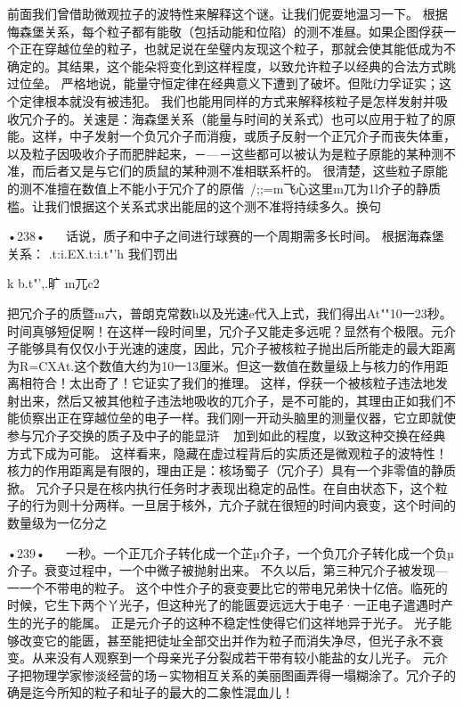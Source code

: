 前面我们曾借助微观拉子的波特性来解释这个谜。让我们伲耍地温习一下。
根据悔森堡关系，每个粒子都有能敬（包括动能和位陷）的测不准昼。如果企图俘获一个正在穿越位垒的粒子，也就足说在垒璧内友现这个粒子，那就会使其能低成为不确定的。其结果，这个能朵将变化到这样程度，以致允许粒子以经典的合法方式眺过位垒。
严格地说，能量守恒定律在经典意义下遭到了破坏。但阰f力孚证实；这个定律根本就没有被违犯。
我们也能用同样的方式来解释核粒子是怎样发射并吸收冗介子的。关速是：海森堡关系（能量与时间的关系式）也可以应用于粒了的原能。这样，中子发射一个负冗介子而消瘦，或质子反射一个正冗介子而丧失体重，以及粒子因吸收介子而肥胖起来，－—－这些都可以被认为是粒子原能的某种测不准，而后者又是与它们的质鼠的某种测不准相联系杆的。
很清楚，这些粒子原能的测不准擅在数值上不能小于冗介了的原偕~/;;=m飞心这里m兀为1l介子的静质槛。让我们恨据这个关系式求出能屈的这个测不准将持续多久。换句

•238•
  
话说，质子和中子之间进行球赛的一个周期需多长时间。
根据海森堡关系：
.t:i.EX.t:i.t"'h
我们罚出

k
b.t"',.旷
m兀c2

把冗介子的质暨m六，普朗克常数h以及光速e代入上式，我们得出At""10一23秒。
时间真够短促啊！在这样一段时间里，冗介子又能走多远呢？显然有个极限。元介子能够具有仅仅小于光速的速度，因此，冗介子被核粒子抛出后所能走的最大距离为R=CXAt.这个数值大约为10一13厘米。但这一数值在数量级上与核力的作用距离相符合！太出奇了！它证实了我们的推理。
这样，俘获一个被核粒子违法地发射出来，然后又被其他粒子违法地吸收的兀介子，是不可能的，其理由正如我们不能侦察出正在穿越位垒的电子一样。我们刚一开动头脑里的测量仪器，它立即就使参与冗介子交换的质子及中子的能显浒
~
加到如此的程度，以致这种交换在经典方式下成为可能。
这样看来，隐藏在虚过程背后的实质还是微观粒子的波特性！核力的作用距离是有限的，理由正是：核场蜀子（冗介子）具有一个非零值的静质掀。
冗介子只是在核内执行任务时才表现出稳定的品性。在自由状态下，这个粒子的行为则十分两样。一旦居于核外，亢介子就在很短的时间内衰变，这个时间的数量级为一亿分之

•239•
  
一秒。一个正兀介子转化成一个芷µ介子，一个负兀介子转化成一个负µ介子。衰变过程中，一个中微子被抛射出来。
不久以后，第三种冗介子被发现—一一个不带电的粒子。
这个中性介子的衰变要比它的带电兄弟快十亿倍。临死的时候，它生下两个丫光子，但这种光了的能匮耍远远大于电子·一正电子遣遇时产生的光子的能属。
正是元介子的这种不稳定性使得它们这祥地异于光子。
光子能够改变它的能匮，甚至能把徒址全部交出并作为粒子而消失净尽，但光子永不衰变。从来没有人观察到一个母亲光子分裂成若干带有较小能盐的女儿光子。
元介子把物理学家惨淡经营的场－实物相互关系的美丽图画弄得一塌糊涂了。冗介子的确是迄今所知的粒子和址子的最大的二象性混血儿！

